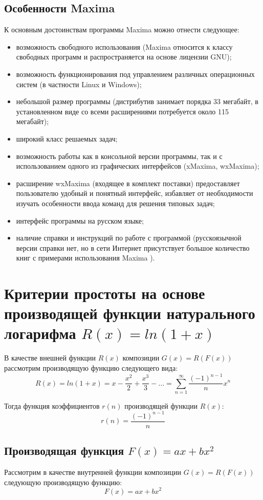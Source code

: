 \documentclass[
russian,
cp1251,
14pt,
simple
]{eskdtext}
\theoremstyle{definition}
\begin{document}
\subsection{Особенности Maxima}
К основным достоинствам программы Maxima можно отнести следующее:
\begin{itemize}
\item возможность свободного использования (Maxima относится к классу свободных программ и распространяется на основе лицензии GNU);
\item возможность функционирования под управлением различных операционных систем (в
частности Linux и Windows); 
\item небольшой размер программы (дистрибутив занимает порядка 33 мегабайт, в установленном виде со всеми расширениями потребуется около 115 мегабайт);
\item широкий класс решаемых задач; 
\item возможность работы как в консольной версии программы, так и с использованием одного из графических интерфейсов (xMaxima, wxMaxima); 
\item расширение wxMaxima (входящее в комплект поставки) предоставляет пользователю удобный и понятный интерфейс, избавляет от необходимости изучать особенности ввода команд для решения типовых задач; 
\item интерфейс программы на русском языке; 
\item наличие справки и инструкций по работе с программой (русскоязычной версии справки нет, но в сети Интернет присутствует большое количество книг с примерами использования Maxima \cite{Maxima_Stahin, Maxima_Chichkarev}).
\end{itemize}


\newpage
\section{Критерии простоты на основе производящей функции натурального логарифма $R(x)=ln(1+x)$}
В качестве внешней функции $R(x)$ композиции $G(x)=R(F(x))$ рассмотрим производящую функцию следующего вида:
$$
R(x)=ln(1+x)=x-\frac{x^2}{2}+\frac{x^3}{3}-\ldots=\sum^{\infty}_{n=1}{\frac{(-1)^{n-1}}{n}x^n}
$$

Тогда функция коэффициентов $r(n)$ производящей функции $R(x)$:
$$
r(n)=\frac{(-1)^{n-1}}{n}
$$

\subsection{Производящая функция $F(x)=ax+bx^2$}
Рассмотрим в качестве внутренней функции композиции $G(x)=R(F(x))$ следующую производящую функцию:
$$
F(x)=ax+bx^2
$$
\end{document}

